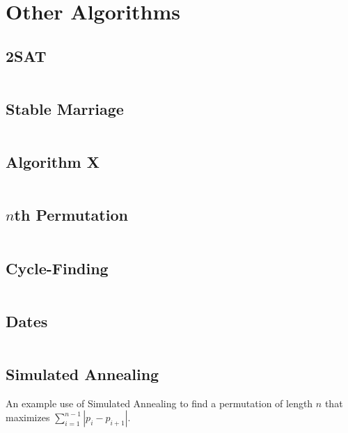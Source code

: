 \documentclass[9pt,a4paper,twocolumn,landscape,oneside]{amsart}
\newcommand{\code}[1]{\inputminted{cpp}{_code/#1}}
\newif\ifverbose
\begin{document}
\section{Other Algorithms}
    \subsection{2SAT}
        \ifverbose
        A fast 2SAT solver.
        \fi
        \code{other/two_sat.cpp}

    \subsection{Stable Marriage}
        \ifverbose
        The Gale-Shapley algorithm for solving the stable marriage problem.
        \fi
        \code{other/stable_marriage.cpp}

    \subsection{Algorithm X}
        \ifverbose
        An implementation of Knuth's Algorithm X, using dancing links. Solves the Exact Cover problem.
        \fi
        \code{other/algorithm_x.cpp}

    \subsection{$n$th Permutation}
        \ifverbose
        A very fast algorithm for computing the $n$th permutation of the list
        $\{0,1,\ldots,k-1\}$.
        \fi
        \code{other/nth_permutation.cpp}

    \subsection{Cycle-Finding}
        \ifverbose
        An implementation of Floyd's Cycle-Finding algorithm.
        \fi
        \code{other/floyds_algorithm.cpp}

    \subsection{Dates}
        \ifverbose
        Functions to simplify date calculations.
        \fi
        \code{other/dates.cpp}

    \subsection{Simulated Annealing}
        An example use of Simulated Annealing to find a permutation of length $n$
        that maximizes $\sum_{i=1}^{n-1}|p_i - p_{i+1}|$.
        \code{other/simulated_annealing.cpp}
\end{document}
